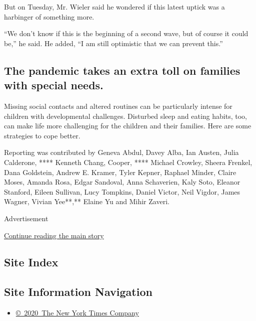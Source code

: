 But on Tuesday, Mr. Wieler said he wondered if this latest uptick was a
harbinger of something more.

``We don't know if this is the beginning of a second wave, but of course
it could be,'' he said. He added, ``I am still optimistic that we can
prevent this.''

\hypertarget{the-pandemic-takes-an-extra-toll-on-families-with-special-needs}{%
\subsection{The pandemic takes an extra toll on families with special
needs.}\label{the-pandemic-takes-an-extra-toll-on-families-with-special-needs}}

Missing social contacts and altered routines can be particularly intense
for children with developmental challenges. Disturbed sleep and eating
habits, too, can make life more challenging for the children and their
families. Here are some strategies to cope better.

Reporting was contributed by Geneva Abdul, Davey Alba, Ian Austen, Julia
Calderone, **** Kenneth Chang, Cooper, **** Michael Crowley, Sheera
Frenkel, Dana Goldstein, Andrew E. Kramer, Tyler Kepner, Raphael Minder,
Claire Moses, Amanda Rosa, Edgar Sandoval, Anna Schaverien, Kaly Soto,
Eleanor Stanford, Eileen Sullivan, Lucy Tompkins, Daniel Victor, Neil
Vigdor, James Wagner, Vivian Yee**,** Elaine Yu and Mihir Zaveri.

Advertisement

\protect\hyperlink{after-bottom}{Continue reading the main story}

\hypertarget{site-index}{%
\subsection{Site Index}\label{site-index}}

\hypertarget{site-information-navigation}{%
\subsection{Site Information
Navigation}\label{site-information-navigation}}

\begin{itemize}
\tightlist
\item
  \href{https://help.nytimes3xbfgragh.onion/hc/en-us/articles/115014792127-Copyright-notice}{©~2020~The
  New York Times Company}
\end{itemize}

